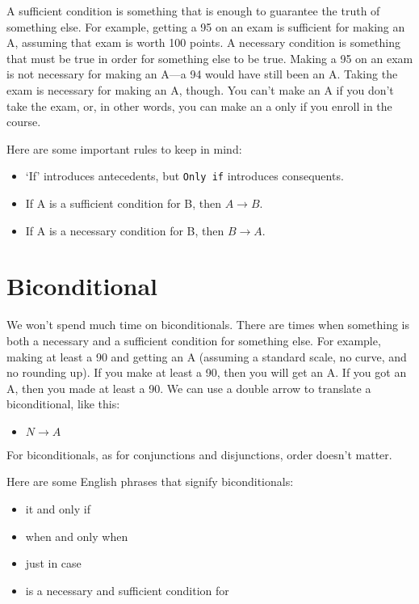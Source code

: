 A sufficient condition is something that is enough to guarantee the truth of something else. For example, getting a 95 on an exam is sufficient for making an A, assuming that exam is worth 100 points. A necessary condition is something that must be true in order for something else to be true. Making a 95 on an exam is not necessary for making an A---a 94 would have still been an A. Taking the exam is necessary for making an A, though. You can't make an A if you don't take the exam, or, in other words, you can make an a only if you enroll in the course.

Here are some important rules to keep in mind:

\begin{itemize}

\item
  `If' introduces antecedents, but \texttt{Only\ if} introduces consequents.
\item
  If A is a sufficient condition for B, then \(A \rightarrow B\).
\item
  If A is a necessary condition for B, then \(B \rightarrow A\).
\end{itemize}

\section{Biconditional}\label{biconditional}

We won't spend much time on biconditionals. There are times when something is both a necessary and a sufficient condition for something else. For example, making at least a 90 and getting an A (assuming a standard scale, no curve, and no rounding up). If you make at least a 90, then you will get an A. If you got an A, then you made at least a 90. We can use a double arrow to translate a biconditional, like this:

\begin{itemize}

\item
  \(N \rightarrow A\)
\end{itemize}

For biconditionals, as for conjunctions and disjunctions, order doesn't matter.

Here are some English phrases that signify biconditionals:

\begin{itemize}

\item
  it and only if
\item
  when and only when
\item
  just in case
\item
  is a necessary and sufficient condition for
\end{itemize}

